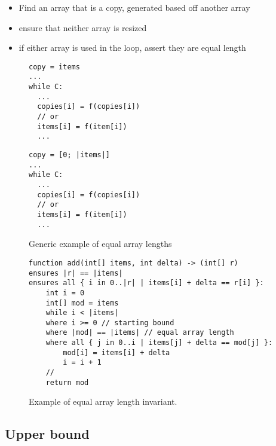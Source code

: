 \begin{itemize}
	\item Find an array that is a copy, generated based off another array
	\item ensure that neither array is resized
	\item if either array is used in the loop, assert they are equal length
\end{itemize}

\begin{figure}[ht]
\noindent
\begin{minipage}{.45\textwidth}
\begin{lstlisting}
copy = items
...
while C:
  ...
  copies[i] = f(copies[i])
  // or
  items[i] = f(item[i])
  ...
\end{lstlisting}
\end{minipage}\hfill
\begin{minipage}{.45\textwidth}
\begin{lstlisting}
copy = [0; |items|]
...
while C:
  ...
  copies[i] = f(copies[i])
  // or
  items[i] = f(item[i])
  ...
\end{lstlisting}
\end{minipage}

\caption{Generic example of equal array lengths}
\label{lst:generic-array-length}
\end{figure}

\begin{figure}[ht]
\begin{lstlisting}
function add(int[] items, int delta) -> (int[] r)
ensures |r| == |items|
ensures all { i in 0..|r| | items[i] + delta == r[i] }:
    int i = 0
    int[] mod = items
    while i < |items|
    where i >= 0 // starting bound
    where |mod| == |items| // equal array length
    where all { j in 0..i | items[j] + delta == mod[j] }:
        mod[i] = items[i] + delta
        i = i + 1
    //
    return mod
\end{lstlisting}
\caption{Example of equal array length invariant.}
\label{lst:array-length-eq}
\end{figure}

\subsection{Upper bound}

